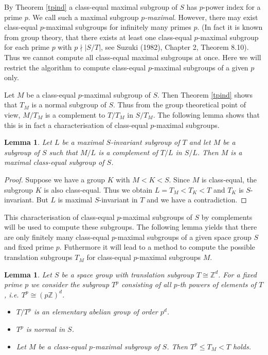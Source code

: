 \documentclass[12pt]{amsart}
\newcommand{\Z}{{\mathbb Z}}
\newtheorem{lemma}[theorem]{Lemma}
\begin{document}
By Theorem \ref{tpind} a class-equal maximal subgroup of $S$ has
$p$-power index for a prime $p$. We call such a maximal subgroup
{\em $p$-maximal}. However, there may exist class-equal $p$-maximal
subgroups for infinitely many primes $p$. (In fact it is known from
group theory, that there exists at least one class-equal $p$-maximal
subgroup for each prime $p$ with $p \nmid |S / T|$, see Suzuki (1982),
Chapter 2, Theorem 8.10). Thus we 
cannot compute all class-equal maximal subgroups at once. Here we will 
restrict the algorithm to compute class-equal $p$-maximal subgroups
of a given $p$ only.

Let $M$ be a class-equal $p$-maximal subgroup of $S$. Then Theorem
\ref{tpind} shows that $T_M$ is a normal subgroup of $S$. Thus from
the group theoretical point of view, $M / T_M$ is a complement to
$T / T_M$ in $S / T_M$. The following lemma shows that this is in
fact a characterisation of class-equal $p$-maximal subgroups.

\begin{lemma}
Let $L$ be a maximal $S$-invariant subgroup of $T$ and let $M$ be
a subgroup of $S$ such that $M / L$ is a complement of $T/L$ in $S/L$.
Then $M$ is a maximal class-equal subgroup of $S$.
\end{lemma}

\begin{proof}
Suppose we have a group $K$ with $M < K < S$. Since $M$ is class-equal,
the subgroup $K$ is also class-equal. Thus we obtain $L = T_M < T_K < T$
and $T_K$ is $S$-invariant. But $L$ is maximal $S$-invariant in $T$ and
we have a contradiction.
\end{proof}

This characterisation of class-equal $p$-maximal subgroups of $S$ by 
complements will be used to compute these subgroups. The following lemma 
yields that there are only finitely many class-equal $p$-maximal subgroups 
of a given space group $S$ and fixed prime $p$. Futhermore it will lead to a
method to compute the possible translation subgroups $T_M$ for
class-equal $p$-maximal subgroups $M$.

\begin{lemma}
Let $S$ be a space group with translation subgroup $T \cong \Z^d$.
For a fixed prime $p$ we consider the subgroup $T^p$ consisting
of all $p$-th powers of elements of $T$, i.e. $T^p \cong (p \Z)^d$.
\begin{itemize}
\item[1.] $T / T^p$ is an elementary abelian group of order $p^d$.
\item[2.] $T^p$ is normal in $S$.
\item[3.] Let $M$ be a class-equal $p$-maximal subgroup of $S$.
          Then $T^p \leq T_M < T$ holds.
\end{itemize}
\end{lemma}
\end{document}

